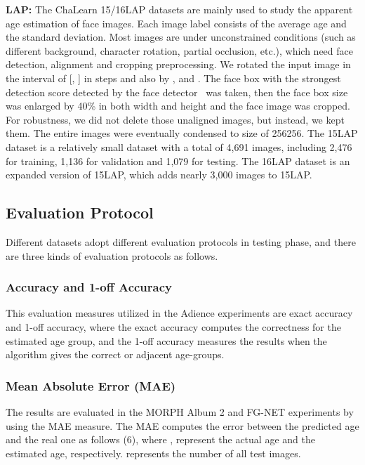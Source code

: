 \documentclass[journal]{IEEEtran}
\begin{document}
\par
\textbf{LAP:} The ChaLearn 15/16LAP datasets are mainly used to study the apparent age estimation of face images. Each image label consists of the average age and the standard deviation. Most images are under unconstrained conditions (such as different background, character rotation, partial occlusion, etc.), which need face detection, alignment and cropping preprocessing. We rotated the input image in the interval of [, ] in  steps and also by ,  and . The face box with the strongest detection score detected by the face detector~\cite{ref-35} was taken, then the face box size was enlarged by 40\% in both width and height and the face image was cropped. For robustness, we did not delete those unaligned images, but instead, we kept them. The entire images were eventually condensed to size of 256256. The 15LAP dataset is a relatively small dataset with a total of 4,691 images, including 2,476 for training, 1,136 for validation and 1,079 for testing. The 16LAP dataset is an expanded version of 15LAP, which adds nearly 3,000 images to 15LAP.

\subsection{Evaluation Protocol}
\par
Different datasets adopt different evaluation protocols in testing phase, and there are three kinds of evaluation protocols as follows.
\subsubsection{Accuracy and 1-off Accuracy}
\par
This evaluation measures utilized in the Adience experiments are exact accuracy and 1-off accuracy, where the exact accuracy computes the correctness for the estimated age group, and the 1-off accuracy measures the results when the algorithm gives the correct or adjacent age-groups.
\subsubsection{Mean Absolute Error (MAE)}
\par
The results are evaluated in the MORPH Album 2 and FG-NET experiments by using the MAE measure. The MAE computes the error between the predicted age and the real one as follows (6), where ,  represent the actual age and the estimated age, respectively.  represents the number of all test images.
\end{document}
